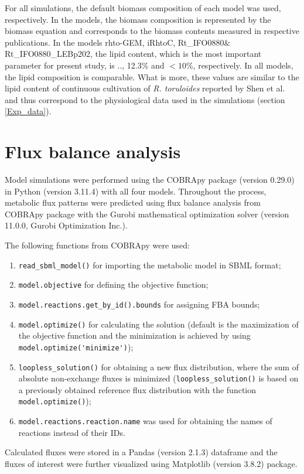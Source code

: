 For all simulations, the default biomass composition of each model was used, respectively. In the models, the biomass composition is represented by the biomass equation and corresponds to the biomass contents measured in respective publications. 
In the models rhto-GEM, iRhtoC, Rt\_IFO0880$\&$Rt\_IFO0880\_LEBp202, the lipid content, which is the most important parameter for present study, is .., 12.3\% and $<10$\%, respectively. In all models, the lipid composition is comparable. What is more, these values are similar to the lipid content of continuous cultivation of \textit{R. toruloides} reported by Shen et al. \cite{Shen2013} and thus correspond to the physiological data used in the simulations (section \ref{Exp_data}).

\section{Flux balance analysis} 

Model simulations were performed using the COBRApy
package (version 0.29.0) \cite{Ebrahim2013} in Python (version 3.11.4) with all four models. 
Throughout the process, metabolic flux patterns were predicted using flux balance analysis \cite{Orth2010} from COBRApy package with the Gurobi mathematical optimization solver (version 11.0.0, Gurobi Optimization Inc.). 

The following functions from COBRApy were used:
\vspace{-0.4cm} %
\begin{enumerate}[noitemsep, label=(\roman*)]
    \item \verb|read_sbml_model()| for importing the metabolic model in SBML format; 
    \item \verb|model.objective| for defining the objective function; 
    \item \verb|model.reactions.get_by_id().bounds| for assigning FBA bounds; 
    \item \verb|model.optimize()| for calculating the solution (default is the maximization of the objective function and the minimization is achieved by using \verb|model.optimize('minimize')|); 
    \item \verb|loopless_solution()| for obtaining a new flux distribution, where the sum of absolute non-exchange fluxes is minimized (\verb|loopless_solution()| is based on a previously obtained reference flux distribution with the function \verb|model.optimize()|); 
    \item \verb|model.reactions.reaction.name| was used for obtaining the names of reactions instead of their IDs.
\end{enumerate}
\vspace{-0.4cm} %
Calculated fluxes were stored in a Pandas (version 2.1.3) dataframe and the fluxes of interest were further visualized using Matplotlib (version 3.8.2) package.
 
